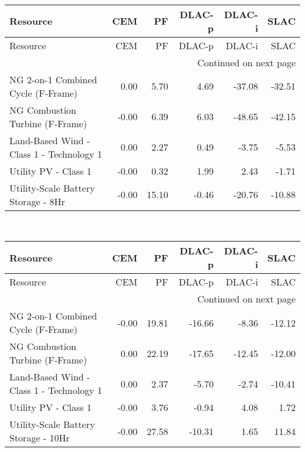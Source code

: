 \documentclass{article}
\begin{document}
\hline
{} \\
\hline
\begin{longtable}{lrrrrr}
\toprule
Resource & CEM & PF & DLAC-p & DLAC-i & SLAC \\
\midrule
\endfirsthead
\toprule
Resource & CEM & PF & DLAC-p & DLAC-i & SLAC \\
\midrule
\endhead
\midrule
\multicolumn{6}{r}{Continued on next page} \\
\midrule
\endfoot
\bottomrule
\endlastfoot
NG 2-on-1 Combined Cycle (F-Frame) & 0.00 & 5.70 & 4.69 & -37.08 & -32.51 \\
NG Combustion Turbine (F-Frame) & -0.00 & 6.39 & 6.03 & -48.65 & -42.15 \\
Land-Based Wind - Class 1 - Technology 1 & 0.00 & 2.27 & 0.49 & -3.75 & -5.53 \\
Utility PV - Class 1 & -0.00 & 0.32 & 1.99 & 2.43 & -1.71 \\
Utility-Scale Battery Storage - 8Hr & -0.00 & 15.10 & -0.46 & -20.76 & -10.88 \\
\end{longtable}


\hline
{} \\
\hline
\begin{longtable}{lrrrrr}
\toprule
Resource & CEM & PF & DLAC-p & DLAC-i & SLAC \\
\midrule
\endfirsthead
\toprule
Resource & CEM & PF & DLAC-p & DLAC-i & SLAC \\
\midrule
\endhead
\midrule
\multicolumn{6}{r}{Continued on next page} \\
\midrule
\endfoot
\bottomrule
\endlastfoot
NG 2-on-1 Combined Cycle (F-Frame) & -0.00 & 19.81 & -16.66 & -8.36 & -12.12 \\
NG Combustion Turbine (F-Frame) & 0.00 & 22.19 & -17.65 & -12.45 & -12.00 \\
Land-Based Wind - Class 1 - Technology 1 & 0.00 & 2.37 & -5.70 & -2.74 & -10.41 \\
Utility PV - Class 1 & -0.00 & 3.76 & -0.94 & 4.08 & 1.72 \\
Utility-Scale Battery Storage - 10Hr & -0.00 & 27.58 & -10.31 & 1.65 & 11.84 \\
\end{longtable}
\end{document}

